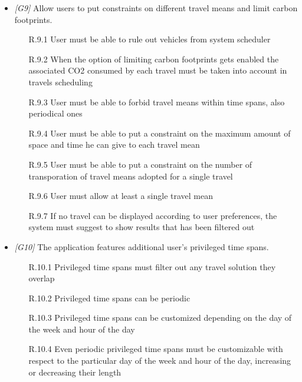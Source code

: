 \begin{itemize}
\item \textit{[G9]} Allow users to put constraints on different travel means and limit carbon footprints.

											\begin{itemize}
											
														\item[R.9.1] User must be able to rule out vehicles from system scheduler
														\item[R.9.2] When the option of limiting carbon footprints gets enabled the associated CO2 consumed by each travel must be taken into account in travels scheduling
														\item[R.9.3] User must be able to forbid travel means within time spans, also periodical ones
														\item[R.9.4] User must be able to put a constraint on the maximum amount of space and time he can give to each travel mean
														\item[R.9.5] User must be able to put a constraint on the number of transporation of travel means adopted for a single travel
														\item[R.9.6] User must allow at least a single travel mean 
														\item[R.9.7] If no travel can be displayed according to user preferences, the system must suggest to show results that has been filtered out														
																						
											\end{itemize}



\item \textit{[G10]} The application features additional user’s privileged time spans.

											\begin{enumerate}
														\item[R.10.1] Privileged time spans must filter out any travel solution they overlap 
														\item[R.10.2] Privileged time spans can be periodic
														\item[R.10.3] Privileged time spans can be customized depending on the day of the week and hour of the day
														\item[R.10.4] Even periodic privileged time spans must be customizable with respect to the particular day of the week and hour of the day, increasing or decreasing their length
														

\end{enumerate}
\end{itemize}
